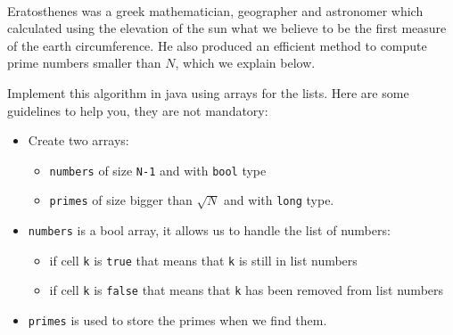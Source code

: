 \documentclass{exercices}
\renewcommand{\|}{\url|}
\begin{document}
\begin{exercice}\\
Eratosthenes was a greek mathematician, geographer and astronomer which calculated using the
elevation of the sun what we believe to be the first measure of the earth circumference.
He also produced an efficient method to compute prime numbers smaller than $N$, which we
explain below.
\begin{center}
\end{center}

Implement this algorithm in java using arrays for the lists. Here are some guidelines to
help you, they are not mandatory:
\begin{itemize}
\item Create two arrays:
\begin{itemize}
\item \verb!numbers! of size \verb!N-1! and with \verb!bool! type
\item \verb!primes! of size bigger than $\sqrt{N}$ and with \verb!long! type.
\end{itemize}
\item \verb!numbers! is a bool array, it allows us to handle the list of numbers:
\begin{itemize}
\item if cell \verb!k! is \verb!true! that means that \verb!k! is still in list numbers
\item if cell \verb!k! is \verb!false! that means that \verb!k! has been removed from list numbers
\end{itemize}
\item \verb!primes! is used to store the primes when we find them.
\end{itemize}
\end{exercice}
\end{document}
